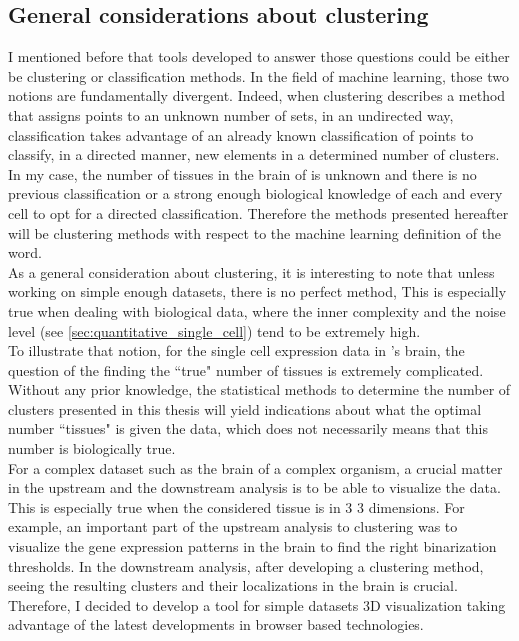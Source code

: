 	\subsection{General considerations about clustering}
	I mentioned before that tools developed to answer those questions could be either be clustering or classification methods. In the field of machine learning, those two notions are fundamentally divergent. Indeed, when clustering describes a method that assigns points to an unknown number of sets, in an undirected way, classification takes advantage of an already known classification of points to classify, in a directed manner, new elements in a determined number of clusters.\\
	
	In my case, the number of tissues in the brain of \platy{} is unknown and there is no previous classification or a strong enough biological knowledge of each and every cell to opt for a directed classification. Therefore the methods presented hereafter will be clustering methods with respect to the machine learning definition of the word.\\
	
	As a general consideration about clustering, it is interesting to note that unless working on simple enough datasets, there is no perfect method, This is especially true when dealing with biological data, where the inner complexity and the noise level (see \ref{sec:quantitative_single_cell}) tend to be extremely high. \\
	
	To illustrate that notion, for the single cell expression data in \platy{}'s brain, the question of the finding the ``true" number of tissues is extremely complicated. Without any prior knowledge, the statistical methods to determine the number of clusters presented in this thesis will yield indications about what the optimal number ``tissues" is given the data, which does not necessarily means that this number is biologically true.\\
	
	For a complex dataset such as the brain of a complex organism, a crucial matter in the upstream and the downstream analysis is to be able to visualize the data. This is especially true when the considered tissue is in 3 3 dimensions. For example, an important part of the upstream analysis to clustering was to visualize the gene expression patterns in the brain to find the right binarization thresholds. In the downstream analysis, after developing a clustering method, seeing the resulting clusters and their localizations in the brain is crucial. Therefore, I decided to develop a tool for simple datasets 3D visualization taking advantage of the latest developments in browser based technologies.
	
